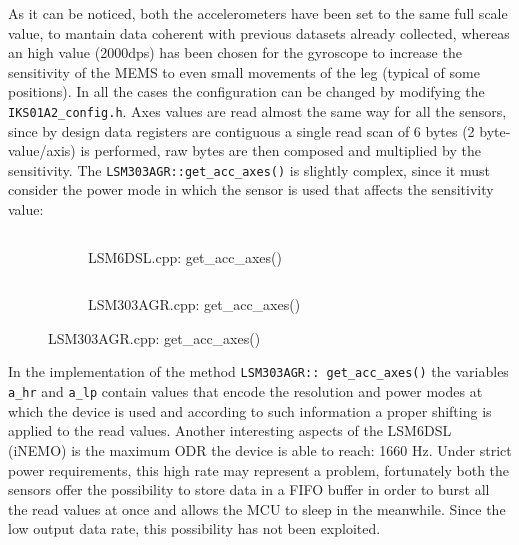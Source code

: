 As it can be noticed, both the accelerometers have been set to the same full scale value, to mantain data coherent with previous datasets already collected, whereas an high value (2000dps) has been chosen for the gyroscope to increase the sensitivity of the MEMS to even small movements of the leg (typical of some positions). In all the cases the configuration can be changed by modifying the \texttt{IKS01A2_config.h}.\newline
Axes values are read almost the same way for all the sensors, since by design data registers are contiguous a single read scan of 6 bytes (2 byte-value/axis) is performed, raw bytes are then composed and multiplied by the sensitivity. The \texttt{LSM303AGR::get_acc_axes()} is slightly complex, since it must consider the power mode in which the sensor is used that affects the sensitivity value:
\begin{center}
	\begin{figure}[H]
		\begin{subfigure}[H]{0.5\textwidth}
			\inputminted[framesep=1.5cm, firstline=101, lastline=127, bgcolor=whitesmoke, fontsize=\tiny]{C++}{code/data_gathering.cpp}
			\vspace{-20pt}
			\caption{LSM6DSL.cpp: get\_acc\_axes()}\label{fig:5a}
		\end{subfigure}
		\hfill
		\begin{subfigure}[H]{0.5\textwidth}
			\vspace{+1pt}
			\inputminted[framesep=1.5cm, firstline=149, lastline=189, bgcolor=whitesmoke, fontsize=\tiny]{C++}{code/data_gathering.cpp}
			\vspace{-20pt}
			\caption{LSM303AGR.cpp: get\_acc\_axes()}\label{fig:5b}
		\end{subfigure}
	\end{figure}
\end{center}
 In the implementation of the method \texttt{LSM303AGR:: get_acc_axes()} the variables \texttt{a_hr} and \texttt{a_lp} contain values that encode the resolution and power modes at which the device is used and according to such information a proper shifting is applied to the read values.\newline
 Another interesting aspects of the LSM6DSL (iNEMO) is the maximum ODR the device is able to reach: 1660 Hz. Under strict power requirements, this high rate may represent a problem, fortunately both the sensors offer the possibility to store data in a FIFO  buffer in order to burst all the read values at once and allows the MCU to sleep in the meanwhile. Since the low output data rate, this possibility has not been exploited.
 \newpage 
